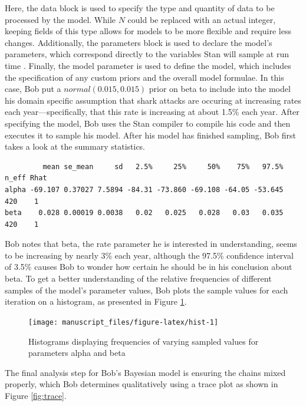 \documentclass[
  12pt,
]{book}
\theoremstyle{definition}
\theoremstyle{definition}
\theoremstyle{definition}
\theoremstyle{remark}
\begin{document}
Here, the data block is used to specify the type and quantity of data to be processed by the model. While \(N\) could be replaced with an actual integer, keeping fields of this type allows for models to be more flexible and require less changes. Additionally, the parameters block is used to declare the model's parameters, which correspond directly to the variables Stan will sample at run time \citep[  8.1]{StanManual2016}. Finally, the model parameter is used to define the model, which includes the specification of any custom priors and the overall model formulae. In this case, Bob put a \(normal(0.015,0.015)\) prior on beta to include into the model his domain specific assumption that shark attacks are occuring at increasing rates each year---specifically, that this rate is increasing at about 1.5\% each year. After specifying the model, Bob uses the Stan compiler to compile his code and then executes it to sample his model. After his model has finished sampling, Bob first takes a look at the summary statistics.

\begin{verbatim}
         mean se_mean     sd   2.5%     25%     50%    75%   97.5% n_eff Rhat
alpha -69.107 0.37027 7.5894 -84.31 -73.860 -69.108 -64.05 -53.645   420    1
beta    0.028 0.00019 0.0038   0.02   0.025   0.028   0.03   0.035   420    1
\end{verbatim}

Bob notes that beta, the rate parameter he is interested in understanding, seems to be increasing by nearly 3\% each year, although the 97.5\% confidence interval of 3.5\% causes Bob to wonder how certain he should be in his conclusion about beta. To get a better understanding of the relative frequencies of different samples of the model's parameter values, Bob plots the sample values for each iteration on a histogram, as presented in Figure \ref{fig:hist}.

\begin{figure}

{\centering \texttt{[image: manuscript\_files/figure-latex/hist-1]} 

}

\caption{Histograms displaying frequencies of varying sampled values for parameters alpha and beta}\label{fig:hist}
\end{figure}

The final analysis step for Bob's Bayesian model is ensuring the chains mixed properly, which Bob determines qualitatively using a trace plot as shown in Figure \ref{fig:trace}.
\end{document}
